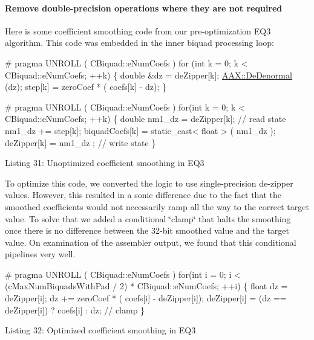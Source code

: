 \hypertarget{a00362_subsubsection__remove_doubleprecision_operations_where_they_are_not_required_}{}\paragraph{Remove double-\/precision operations where they are not required}\label{a00362_subsubsection__remove_doubleprecision_operations_where_they_are_not_required_}
 Here is some coefficient smoothing code from our pre-\/optimization E\+Q3 algorithm. This code was embedded in the inner biquad processing loop\+:


\begin{DoxyCode}
\textcolor{preprocessor}{# pragma UNROLL ( CBiquad::eNumCoefs )}
\textcolor{keywordflow}{for} (\textcolor{keywordtype}{int} k = 0; k < CBiquad::eNumCoefs; ++k)
\{
    \textcolor{keywordtype}{double} &dz = deZipper[k];
    \hyperlink{a00288_aaf103dc75b68b6c4f6792dd26f9b4fd0}{AAX::DeDenormal} (dz);
    step[k] = zeroCoef * ( coefs[k] - dz);
\}
 
\textcolor{preprocessor}{# pragma UNROLL ( CBiquad::eNumCoefs )}
\textcolor{keywordflow}{for}(\textcolor{keywordtype}{int} k = 0; k < CBiquad::eNumCoefs; ++k)
\{
    \textcolor{keywordtype}{double} nm1\_dz = deZipper[k]; \textcolor{comment}{// read state}
    nm1\_dz += step[k];
    biquadCoefs[k] = \textcolor{keyword}{static\_cast<} \textcolor{keywordtype}{float} \textcolor{keyword}{>} ( nm1\_dz );
    deZipper[k] = nm1\_dz ; \textcolor{comment}{// write state}
\} 
\end{DoxyCode}
  Listing 31\+: Unoptimized coefficient smoothing in E\+Q3

To optimize this code, we converted the logic to use single-\/precision de-\/zipper values. However, this resulted in a sonic difference due to the fact that the smoothed coefficients would not necessarily ramp all the way to the correct target value. To solve that we added a conditional \char`\"{}clamp\char`\"{} that halts the smoothing once there is no difference between the 32-\/bit smoothed value and the target value. On examination of the assembler output, we found that this conditional pipelines very well.


\begin{DoxyCode}
\textcolor{preprocessor}{# pragma UNROLL ( CBiquad::eNumCoefs )}
\textcolor{keywordflow}{for}(\textcolor{keywordtype}{int} i = 0; i < (cMaxNumBiquadsWithPad / 2) * CBiquad::eNumCoefs; ++i)
\{
    \textcolor{keywordtype}{float} dz = deZipper[i];
    dz += zeroCoef * ( coefs[i] - deZipper[i]);
    deZipper[i] = (dz == deZipper[i]) ? coefs[i] : dz; \textcolor{comment}{// clamp}
\} 
\end{DoxyCode}
  Listing 32\+: Optimized coefficient smoothing in E\+Q3

